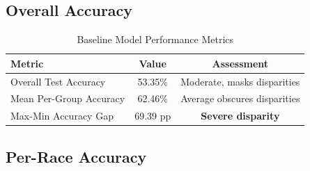 \documentclass[11pt,a4paper,oneside]{report}
\begin{document}
\subsection{Overall Accuracy}

\begin{table}[h]

\centering

\caption{Baseline Model Performance Metrics}

\begin{tabular}{|l|c|c|}

\hline

\textbf{Metric} & \textbf{Value} & \textbf{Assessment} \\

\hline

Overall Test Accuracy & 53.35\% & Moderate, masks disparities \\

\hline

Mean Per-Group Accuracy & 62.46\% & Average obscures disparities \\

\hline

Max-Min Accuracy Gap & 69.39 pp & \textbf{Severe disparity} \\

\hline

\end{tabular}

\end{table}

\subsection{Per-Race Accuracy}
\end{document}
